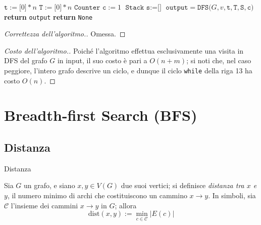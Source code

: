 \documentclass[a4paper, 12pt]{report}
\begin{document}
    \begin{nocaptionalg}
        \begin{algorithmic}[1]
                \State $\texttt{t} := \texttt{[}0\texttt{]} * n$
                \State $\texttt{T} := \texttt{[}0\texttt{]} * n$
                \State $\texttt{Counter c} := 1$
                \State $\texttt{Stack s} := \texttt{[]}$
                        \State $\texttt{output} = \texttt{DFS(}G, v, \texttt{t}, \texttt{T}, \texttt{S}, \texttt{c)}$
                            \State \textbf{return} \texttt{output}
                        \EndIf
                    \EndIf
                \EndFor
                \State \textbf{return} \texttt{None}
            \EndFunction
        \end{algorithmic}
    \end{nocaptionalg}

    \begin{proof}[Correttezza dell'algoritmo.]
        Omessa.
    \end{proof}

    \begin{proof}[Costo dell'algoritmo.]
        Poiché l'algoritmo effettua esclusivamente una visita in DFS del grafo $G$ in input, il suo costo è pari a $O(n + m)$; si noti che, nel caso peggiore, l'intero grafo descrive un ciclo, e dunque il ciclo \texttt{while} della riga 13 ha costo $O(n)$.
    \end{proof}

    \section{Breadth-first Search (BFS)}

    \subsection{Distanza}

    \begin{frameddefn}{Distanza}
        \label{distanza}

        Sia $G$ un grafo, e siano $x, y \in V(G)$ due suoi vertici; si definisce \textit{distanza tra $x$ e $y$}, il numero minimo di archi che costituiscono un cammino $x \rightarrow y$. In simboli, sia $\mathcal{C}$ l'insieme dei cammini $x \rightarrow y$ in $G$; allora $$\mathrm{dist}(x, y) := \min_{c \in \mathcal{C}}{\left |E(c) \right|}$$
    \end{frameddefn}
\end{document}
